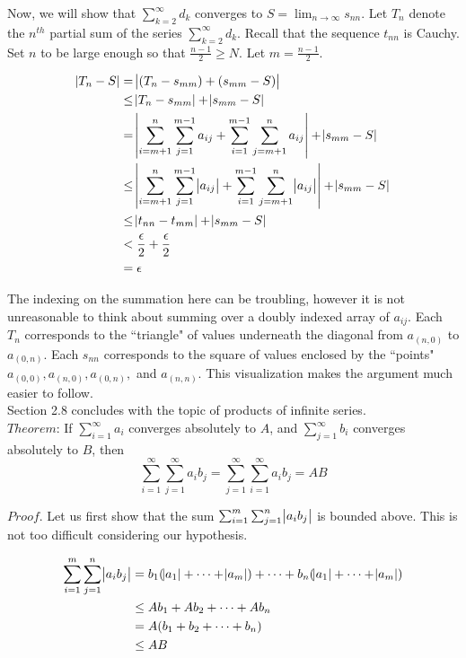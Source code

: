 \documentclass{article}
\begin{document}
Now, we will show that $\sum_{k=2}^\infty d_k$ converges to $S = \lim_{n \to \infty} s_{nn}$. Let $T_n$ denote the $n^{th}$ partial sum of the series $\sum_{k=2}^\infty d_k$. Recall that the sequence $t_{nn}$ is Cauchy. Set $n$  to be large enough so that $\frac{n-1}{2} \geq N$. Let $m = \frac{n-1}{2}$.

\begin{equation}
\begin{split}
    \abs{T_n - S} &= \abs{(T_n - s_{mm}) + (s_{mm} - S)} \\
    &\leq \abs{T_n - s_{mm}} + \abs{s_{mm} - S} \\
    &= \abs{\sum_{i=m+1}^n \sum_{j=1}^{m-1} a_{ij} + \sum_{i=1}^{m-1} \sum_{j=m+1}^n a_{ij}} + \abs{s_{mm} - S} \\
    &\leq \abs{\sum_{i=m+1}^n \sum_{j=1}^{m-1} \abs{a_{ij}} + \sum_{i=1}^{m-1} \sum_{j=m+1}^n \abs{a_{ij}}} + \abs{s_{mm} - S} \\
    &\leq \abs{t_{nn} - t_{mm}} + \abs{s_{mm} - S} \\
    &< \frac{\epsilon}{2} + \frac{\epsilon}{2} \\
    &= \epsilon
\end{split}
\end{equation}

The indexing on the summation here can be troubling, however it is not unreasonable to think about summing over a doubly indexed array of $a_{ij}$. Each $T_n$ corresponds to the ``triangle" of values underneath the diagonal from $a_{(n,0)}$ to $a_{(0, n)}$. Each $s_{nn}$ corresponds to the square of values enclosed by the ``points" $a_{(0,0)}, a_{(n, 0)}, a_{(0, n)},$ and $a_{(n, n)}$. This visualization makes the argument much easier to follow.\\

Section 2.8 concludes with the topic of products of infinite series. \\

$Theorem$: If $\sum_{i=1}^\infty a_i$ converges absolutely to $A$, and $\sum_{j=1}^\infty b_i$ converges absolutely to $B$, then 
\begin{equation*}
    \sum_{i=1}^\infty \sum_{j=1}^\infty a_i b_j =  \sum_{j=1}^\infty \sum_{i=1}^\infty a_i b_j = AB
\end{equation*}

$Proof.$ Let us first show that the sum $\sum_{i=1}^m \sum_{j=1}^n \abs{a_i b_j}$ is bounded above. This is not too difficult considering our hypothesis. 

\begin{equation*}
\begin{split}
    \sum_{i=1}^m \sum_{j=1}^n \abs{a_i b_j} &= b_1(\abs{a_1}  + \dots + \abs{a_m}) + \dots + b_n(\abs{a_1} + \dots + \abs{a_m}) \\
    &\leq Ab_1 + Ab_2 + \dots + Ab_n \\
    &= A(b_1 + b_2 + \dots + b_n) \\
    &\leq AB
\end{split}
\end{equation*}
\end{document}
